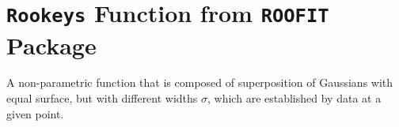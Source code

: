 \section{\texttt{Rookeys} Function from \texttt{ROOFIT} Package}
\label{RK}
A non-parametric function that is composed of superposition of Gaussians with equal surface, but with different widths $\sigma$, which are established by data at a given point.



